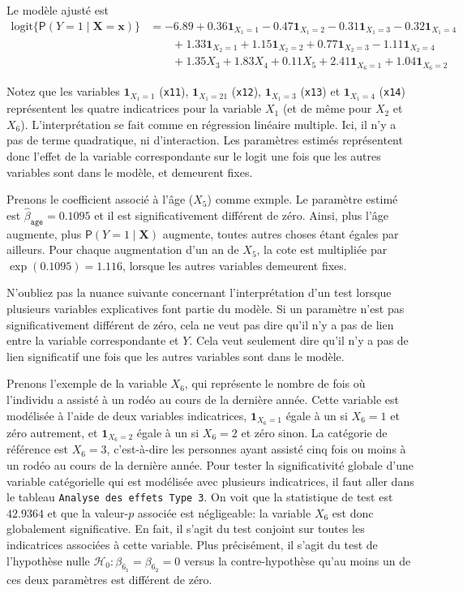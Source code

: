 \documentclass[
  11pt,
  letterpaper,
]{book}
\theoremstyle{definition}
\theoremstyle{definition}
\theoremstyle{definition}
\theoremstyle{definition}
\theoremstyle{remark}
\begin{document}
Le modèle ajusté est
\begin{align*}
 \mathrm{logit}\{{\mathsf P}\left(Y=1 \mid \boldsymbol{X}=\boldsymbol{x}\right)\} &= -6.89 + 0.36{\mathbf 1}_{X_1=1} - 0.47{\mathbf 1}_{X_1=2} - 0.31{\mathbf 1}_{X_1=3} - 0.32{\mathbf 1}_{X_1=4} \\& \qquad 
+ 1.33{\mathbf 1}_{X_2=1} + 1.15{\mathbf 1}_{X_2=2} + 0.77{\mathbf 1}_{X_2=3} - 1.11{\mathbf 1}_{X_2=4} \\&\qquad 
+ 1.35X_3+ 1.83X_4
+ 0.11X_5
+ 2.41{\mathbf 1}_{X_6=1} + 1.04{\mathbf 1}_{X_6=2}
\end{align*}

Notez que les variables \({\mathbf 1}_{X_1=1}\) (\texttt{x11}), \({\mathbf 1}_{X_1=21}\) (\texttt{x12}), \({\mathbf 1}_{X_1=3}\) (\texttt{x13}) et \({\mathbf 1}_{X_1=4}\) (\texttt{x14}) représentent les quatre indicatrices pour la variable \(X_1\) (et de même pour \(X_2\) et \(X_6\)). L'interprétation se fait comme en régression linéaire multiple. Ici, il n'y a pas de terme quadratique, ni d'interaction. Les paramètres estimés représentent donc l'effet de la variable correspondante sur le logit une fois que les autres variables sont dans le modèle, et demeurent fixes.

Prenons le coefficient associé à l'âge (\(X_5\)) comme exmple. Le paramètre estimé est \(\widehat{\beta}_{\texttt{age}}=0.1095\) et il est significativement différent de zéro. Ainsi, plus l'âge augmente, plus \({\mathsf P}\left(Y=1\mid \boldsymbol{X}\right)\) augmente, toutes autres choses étant égales par ailleurs. Pour chaque augmentation d'un an de \(X_5\), la cote est multipliée par \(\exp(0.1095)=1.116\), lorsque les autres variables demeurent fixes.

N'oubliez pas la nuance suivante concernant l'interprétation d'un test lorsque plusieurs variables explicatives font partie du modèle. Si un paramètre n'est pas significativement différent de zéro, cela ne veut pas dire qu'il n'y a pas de lien entre la variable correspondante et \(Y\). Cela veut seulement dire qu'il n'y a pas de lien significatif une fois que les autres variables sont dans le modèle.

Prenons l'exemple de la variable \(X_6\), qui représente le nombre de fois où l'individu a assisté à un rodéo au cours de la dernière année. Cette variable est modélisée à l'aide de deux variables indicatrices, \({\mathbf 1}_{X_6=1}\) égale à un si \(X_6=1\) et zéro autrement, et \({\mathbf 1}_{X_6=2}\) égale à un si \(X_6=2\) et zéro sinon. La catégorie de référence est \(X_6=3\), c'est-à-dire les personnes ayant assisté cinq fois ou moins à un rodéo au cours de la dernière année. Pour tester la significativité globale d'une variable catégorielle qui est modélisée avec plusieurs indicatrices, il faut aller dans le tableau \texttt{Analyse\ des\ effets\ Type\ 3}. On voit que la statistique de test est \(42.9364\) et que la valeur-\(p\) associée est négligeable: la variable \(X_6\) est donc globalement significative. En fait, il s'agit du test conjoint sur toutes les indicatrices associées à cette variable. Plus précisément, il s'agit du test de l'hypothèse nulle \(\mathcal{H}_0: \beta_{6_{\texttt{1}}}=\beta_{6_{\texttt{2}}}=0\) versus la contre-hypothèse qu'au moins un de ces deux paramètres est différent de zéro.
\end{document}

